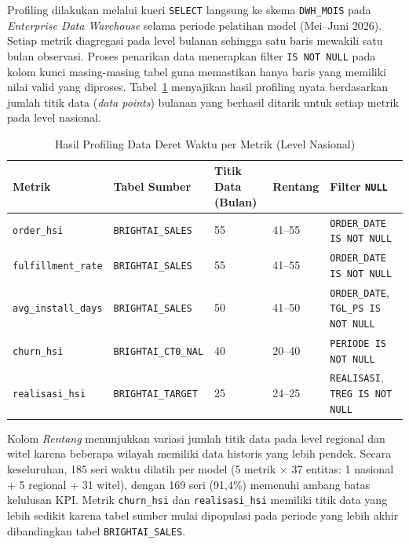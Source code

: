 Profiling dilakukan melalui kueri \texttt{SELECT} langsung ke skema \texttt{DWH\_MOIS} pada \textit{Enterprise Data Warehouse} selama periode pelatihan model (Mei--Juni 2026). Setiap metrik diagregasi pada level bulanan sehingga satu baris mewakili satu bulan observasi. Proses penarikan data menerapkan filter \texttt{IS NOT NULL} pada kolom kunci masing-masing tabel guna memastikan hanya baris yang memiliki nilai valid yang diproses. Tabel~\ref{tab:kualitas-data} menyajikan hasil profiling nyata berdasarkan jumlah titik data (\textit{data points}) bulanan yang berhasil ditarik untuk setiap metrik pada level nasional.

\begin{table}[htbp]
\centering
\caption{Hasil Profiling Data Deret Waktu per Metrik (Level Nasional)}
\label{tab:kualitas-data}
\begin{tabular}{|p{3.4cm}|p{3.2cm}|p{2.4cm}|p{2cm}|p{2.4cm}|}
\hline
\textbf{Metrik} & \textbf{Tabel Sumber} & \textbf{Titik Data (Bulan)} & \textbf{Rentang} & \textbf{Filter \texttt{NULL}} \\
\hline
\texttt{order\_hsi} & \texttt{BRIGHTAI\_SALES} & 55 & 41--55 & \texttt{ORDER\_DATE IS NOT NULL} \\
\hline
\texttt{fulfillment\_rate} & \texttt{BRIGHTAI\_SALES} & 55 & 41--55 & \texttt{ORDER\_DATE IS NOT NULL} \\
\hline
\texttt{avg\_install\_days} & \texttt{BRIGHTAI\_SALES} & 50 & 41--50 & \texttt{ORDER\_DATE}, \texttt{TGL\_PS IS NOT NULL} \\
\hline
\texttt{churn\_hsi} & \texttt{BRIGHTAI\_CT0\_NAL} & 40 & 20--40 & \texttt{PERIODE IS NOT NULL} \\
\hline
\texttt{realisasi\_hsi} & \texttt{BRIGHTAI\_TARGET} & 25 & 24--25 & \texttt{REALISASI}, \texttt{TREG IS NOT NULL} \\
\hline
\end{tabular}
\end{table}

Kolom \textit{Rentang} menunjukkan variasi jumlah titik data pada level regional dan witel karena beberapa wilayah memiliki data historis yang lebih pendek. Secara keseluruhan, 185 seri waktu dilatih per model (5 metrik $\times$ 37 entitas: 1 nasional + 5 regional + 31 witel), dengan 169 seri (91{,}4\%) memenuhi ambang batas kelulusan KPI\@. Metrik \texttt{churn\_hsi} dan \texttt{realisasi\_hsi} memiliki titik data yang lebih sedikit karena tabel sumber mulai dipopulasi pada periode yang lebih akhir dibandingkan tabel \texttt{BRIGHTAI\_SALES}.

